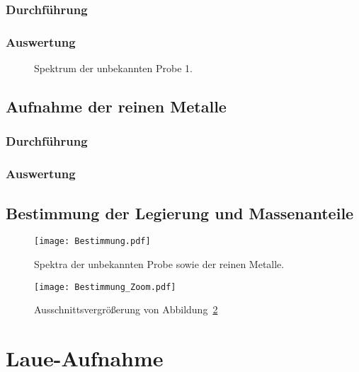 \subsection{Durchführung}

\subsection{Auswertung}

\begin{figure}[htbp]
    \centering
    \caption{%
        Spektrum der unbekannten Probe 1.
    }
    \label{fig:}
\end{figure}

\section{Aufnahme der reinen Metalle}

\subsection{Durchführung}

\subsection{Auswertung}

\section{Bestimmung der Legierung und Massenanteile}

\begin{figure}[htbp]
    \centering
    \texttt{[image: Bestimmung.pdf]}
    \caption{%
        Spektra der unbekannten Probe sowie der reinen Metalle.
    }
    \label{fig:Bestimmung}
\end{figure}

\begin{figure}[htbp]
    \centering
    \texttt{[image: Bestimmung\_Zoom.pdf]}
    \caption{%
        Ausschnittsvergrößerung von Abbildung~\ref{fig:Bestimmung}
    }
    \label{fig:Bestimmung_Zoom}
\end{figure}

\chapter{Laue-Aufnahme}

